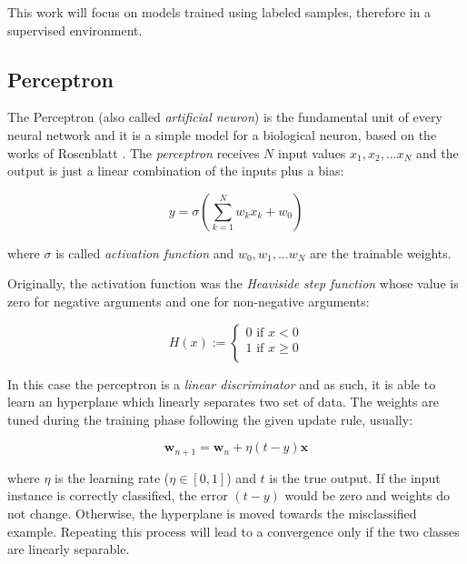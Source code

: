 \documentclass[12pt,a4paper]{report}
\begin{document}
This work will focus on models trained using labeled samples, therefore in a supervised environment.

\subsection*{Perceptron}

The Perceptron (also called \textit{artificial neuron}) is the fundamental unit of every neural network and it is a simple model for a biological neuron, based on the works of Rosenblatt \cite{perceptron}. 
The \textit{perceptron} receives $N$ input values $x_1, x_2, ... x_N$ and the output is just a linear combination of the inputs plus a bias:

\begin{equation}
y = \sigma(\sum_{k=1}^N w_kx_k + w_0)
\end{equation}

where $\sigma$ is called \textit{activation function} and $w_0, w_1, ... w_N$ are the trainable weights.

Originally, the activation function was the \textit{Heaviside step function} whose value is zero for negative arguments and one for non-negative arguments: 

\begin{equation}
H(x) := 
\begin{cases}
  0 \text{ if } x < 0 \\ 
  1 \text{ if } x \geq 0 \\
\end{cases}
\end{equation}

In this case the perceptron is a \textit{linear discriminator} and as such, it is able to learn an hyperplane which linearly separates two set of data.
The weights are tuned during the training phase following the given update rule, usually:

\begin{equation}
 \bm{w}_{n+1} = \bm{w}_n + \eta (t - y)\bm{x}
 \label{eq:perceptron}
\end{equation}

where $\eta$ is the learning rate ($\eta \in [0,1]$) and $t$ is the true output. 
If the input instance is correctly classified,  the error $(t - y)$ would be zero and weights do not change. 
Otherwise, the hyperplane is moved towards the misclassified example. 
Repeating this process will lead to a convergence only if the two classes are linearly separable.  
\end{document}
